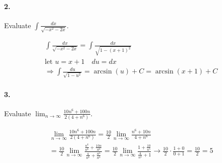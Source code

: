     \paragraph*{2.}
    Evaluate $\int \frac{dx}{\sqrt{-x^{2}-2x}}$.
    \\
    \begin{mdframed}
        \begin{equation*}
            \begin{gathered}
                \int \frac{dx}{\sqrt{-x^{2}-2x}} = \int \frac{dx}{\sqrt{1-(x+1)^{2}}}   \\
                \text{let } u = x+1 \quad du = dx                                       \\
                \Rightarrow \int \frac{du}{\sqrt{1 - u^{2}}} = \arcsin(u) + C = \boxed{\arcsin(x+1)+C}
            \end{gathered}
        \end{equation*}
    \end{mdframed}

    \paragraph*{3.}
    Evaluate $\lim_{n \rightarrow \infty} \frac{10n^{6} + 100n}{2(4 + n^6)}$.
    \\
    \begin{mdframed}
        \begin{equation*}
            \begin{gathered}
                \lim_{n \rightarrow \infty} \frac{10n^{6} + 100n}{2(4 + n^6)} = \frac{10}{2}\lim_{n \rightarrow \infty} \frac{n^{6} + 10n}{4 + n^6} \\
                = \frac{10}{2}\lim_{n \rightarrow \infty} \frac{\frac{n^{6}}{n^{6}} + \frac{10n}{n^{6}}}{\frac{4}{n^{6}} + \frac{n^{6}}{n^{6}}} 
                = \frac{10}{2}\lim_{n \rightarrow \infty} \frac{1 + \frac{10}{n^{5}}}{\frac{4}{n^{6}} + 1}
                \rightarrow \frac{10}{2} \cdot \frac{1 + 0}{0 + 1} = \frac{10}{2} = \boxed{5}
            \end{gathered}
        \end{equation*}
    \end{mdframed}

